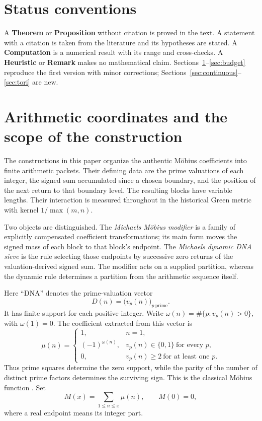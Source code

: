 \documentclass[11pt]{article}
\theoremstyle{definition}
\theoremstyle{remark}
\begin{document}
\tableofcontents

\section*{Status conventions}
A \textbf{Theorem} or \textbf{Proposition} without citation is proved in the text. A statement with a citation is taken from the literature and its hypotheses are stated. A \textbf{Computation} is a numerical result with its range and cross-checks. A \textbf{Heuristic} or \textbf{Remark} makes no mathematical claim. Sections~\ref{sec:coords}--\ref{sec:budget} reproduce the first version with minor corrections; Sections~\ref{sec:continuous}--\ref{sec:tori} are new.

\section{Arithmetic coordinates and the scope of the construction}\label{sec:coords}

The constructions in this paper organize the authentic M\"obius coefficients into finite arithmetic packets. Their defining data are the prime valuations of each integer, the signed sum accumulated since a chosen boundary, and the position of the next return to that boundary level. The resulting blocks have variable lengths. Their interaction is measured throughout in the historical Green metric with kernel $1/\max(m,n)$.

Two objects are distinguished. The \emph{Michaels M\"obius modifier} is a family of explicitly compensated coefficient transformations; its main form moves the signed mass of each block to that block's endpoint. The \emph{Michaels dynamic DNA sieve} is the rule selecting those endpoints by successive zero returns of the valuation-derived signed sum. The modifier acts on a supplied partition, whereas the dynamic rule determines a partition from the arithmetic sequence itself.

Here ``DNA'' denotes the prime-valuation vector
\begin{equation}
D(n) = \big(v_p(n)\big)_{p\ \text{prime}}.
\end{equation}
It has finite support for each positive integer. Write $\omega(n)=\#\{p : v_p(n)>0\}$, with $\omega(1)=0$. The coefficient extracted from this vector is
\begin{equation}\label{eq:mu}
\mu(n)=\begin{cases}1, & n=1,\\ (-1)^{\omega(n)}, & v_p(n)\in\{0,1\}\ \text{for every }p,\\ 0, & v_p(n)\ge2\ \text{for at least one }p.\end{cases}
\end{equation}
Thus prime squares determine the zero support, while the parity of the number of distinct prime factors determines the surviving sign. This is the classical M\"obius function \cite{dlmf272}. Set
\begin{equation}
M(x)=\sum_{1\le n\le x}\mu(n),\qquad M(0)=0,
\end{equation}
where a real endpoint means its integer part.
\end{document}
